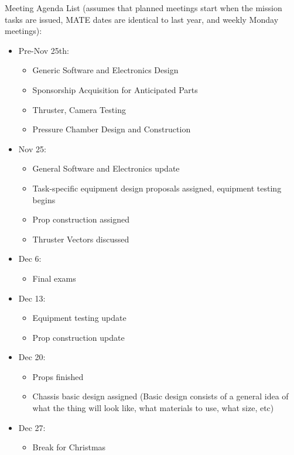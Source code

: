 \documentclass{proposalnsf}
\begin{document}
Meeting Agenda List (assumes that planned meetings start when the
mission tasks are issued, MATE dates are identical to last year, and
weekly Monday meetings):

\begin{itemize}
\item Pre-Nov 25th:
    \begin{itemize}
        \item Generic Software and Electronics Design
        \item Sponsorship Acquisition for Anticipated Parts
        \item Thruster, Camera Testing
        \item Pressure Chamber Design and Construction
    \end{itemize}
\item Nov 25:
    \begin{itemize}
        \item General Software and Electronics update
        \item Task-specific equipment design proposals assigned, equipment
testing begins
        \item Prop construction assigned
        \item Thruster Vectors discussed

    \end{itemize}
\item Dec 6: 
    \begin{itemize} 
        \item Final exams

    \end{itemize}
\item Dec 13:
    \begin{itemize} 
        \item Equipment testing update
         \item Prop construction update

    \end{itemize}
\item Dec 20:
    \begin{itemize} 
         \item Props finished
         \item Chassis basic design assigned (Basic design consists of a general
idea of what the thing will look like, what materials to use, what
size, etc)

    \end{itemize}
\item Dec 27:
    \begin{itemize} 
       \item Break for Christmas


\end{itemize}
\end{itemize}
\end{document}
